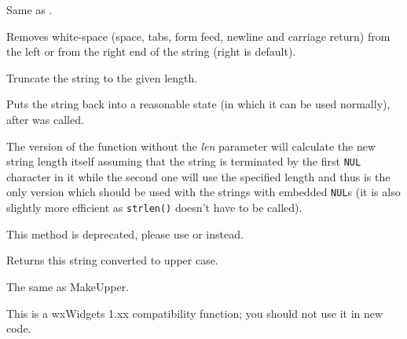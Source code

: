 

Same as .


\label{wxstringtrim}


Removes white-space (space, tabs, form feed, newline and carriage return) from
the left or from the right end of the string (right is default).


\label{wxstringtruncate}


Truncate the string to the given length.


\label{wxstringungetwritebuf}



Puts the string back into a reasonable state (in which it can be used
normally), after
\rtfsp{} was called.

The version of the function without the {\it len} parameter will calculate the
new string length itself assuming that the string is terminated by the first
{\tt NUL} character in it while the second one will use the specified length
and thus is the only version which should be used with the strings with
embedded {\tt NUL}s (it is also slightly more efficient as {\tt strlen()} 
doesn't have to be called).

This method is deprecated, please use
 or
 instead.


\label{wxstringupper}


Returns this string converted to upper case.


\label{wxstringuppercase}


The same as MakeUpper.

This is a wxWidgets 1.xx compatibility function; you should not use it in new code.


